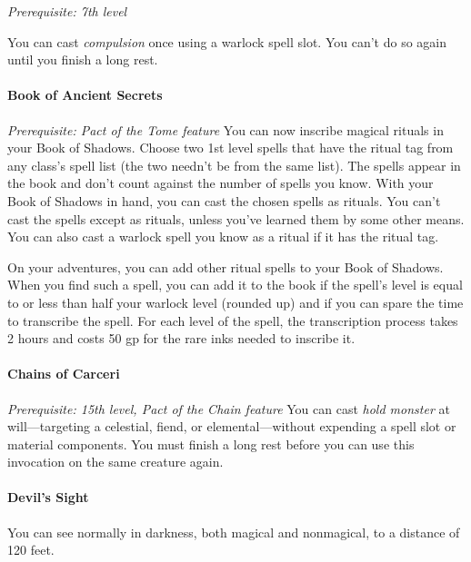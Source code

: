 \documentclass[
]{article}
\begin{document}
\emph{Prerequisite: 7th level}

You can cast \emph{compulsion} once using a warlock spell slot. You
can't do so again until you finish a long rest.

\hypertarget{book-of-ancient-secrets}{%
\paragraph{Book of Ancient Secrets}\label{book-of-ancient-secrets}}

\emph{Prerequisite: Pact of the Tome feature} You can now inscribe
magical rituals in your Book of Shadows. Choose two 1st level spells
that have the ritual tag from any class's spell list (the two needn't be
from the same list). The spells appear in the book and don't count
against the number of spells you know. With your Book of Shadows in
hand, you can cast the chosen spells as rituals. You can't cast the
spells except as rituals, unless you've learned them by some other
means. You can also cast a warlock spell you know as a ritual if it has
the ritual tag.

On your adventures, you can add other ritual spells to your Book of
Shadows. When you find such a spell, you can add it to the book if the
spell's level is equal to or less than half your warlock level (rounded
up) and if you can spare the time to transcribe the spell. For each
level of the spell, the transcription process takes 2 hours and costs 50
gp for the rare inks needed to inscribe it.

\hypertarget{chains-of-carceri}{%
\paragraph{Chains of Carceri}\label{chains-of-carceri}}

\emph{Prerequisite: 15th level, Pact of the Chain feature} You can cast
\emph{hold monster} at will---targeting a celestial, fiend, or
elemental---without expending a spell slot or material components. You
must finish a long rest before you can use this invocation on the same
creature again.

\hypertarget{devils-sight}{%
\paragraph{Devil's Sight}\label{devils-sight}}

You can see normally in darkness, both magical and nonmagical, to a
distance of 120 feet.
\end{document}
